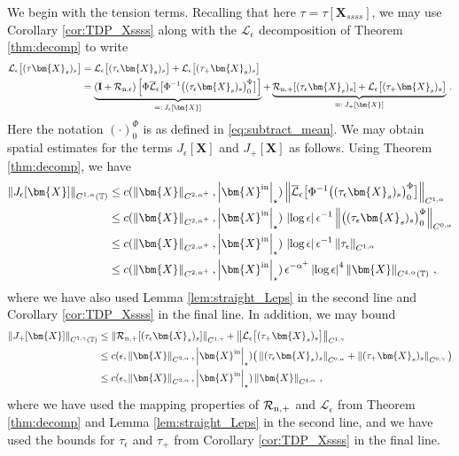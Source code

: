 \documentclass[11pt,reqno]{amsart}
\newcommand{\T}{\mathbb{T}}
\newcommand{\X}{\bm{X}}
\newcommand{\abs}[1]{\left\lvert #1 \right\rvert}
\newcommand{\norm}[1]{\left\lVert #1 \right\rVert}
\newcommand{\mc}[1]{\mathcal{#1}}
\theoremstyle{definition}
\begin{document}
We begin with the tension terms. Recalling that here $\tau=\tau[\X_{ssss}]$, we may use Corollary \ref{cor:TDP_Xssss} along with the $\mc{L}_\epsilon$ decomposition of Theorem \ref{thm:decomp} to write 
\begin{equation}\label{eq:tension_terms}
\begin{aligned}
  \mc{L}_\epsilon\big[(\tau\X_s)_s\big] &= \mc{L}_\epsilon\big[(\tau_\epsilon\X_s)_s\big] + \mc{L}_\epsilon\big[(\tau_+\X_s)_s\big] \\
  &= \underbrace{({\bf I}+\mc{R}_{\rm n,\epsilon})\left[\Phi\overline{\mc{L}}_\epsilon\big[\Phi^{-1}\big((\tau_\epsilon\X_s)_s\big)^\Phi_0\big] \right]}_{=: \,J_\epsilon[\X]} 
  + \underbrace{\mc{R}_{\rm n,+}[(\tau_\epsilon\X_s)_s]+ \mc{L}_\epsilon\big[(\tau_+\X_s)_s\big]}_{=: \,J_+[\X]}\,.
\end{aligned}
\end{equation}
Here the notation $(\cdot)_0^\Phi$ is as defined in \eqref{eq:subtract_mean}. We may obtain spatial estimates for the terms $J_\epsilon[\X]$ and $J_+[\X]$ as follows. Using Theorem \ref{thm:decomp}, we have
\begin{equation}
\begin{aligned}
  \norm{J_\epsilon[\X]}_{C^{1,\alpha}(\T)} &\le c(\norm{\X}_{C^{2,\alpha^+}},\abs{\X^{\rm in}}_\star)\norm{\overline{\mc{L}}_\epsilon\big[\Phi^{-1}\big((\tau_\epsilon\X_s)_s\big)^\Phi_0\big]}_{C^{1,\alpha}} \\
  &\le c(\norm{\X}_{C^{2,\alpha^+}},\abs{\X^{\rm in}}_\star)\,\abs{\log\epsilon}\epsilon^{-1}\norm{\big((\tau_\epsilon\X_s)_s\big)^\Phi_0}_{C^{0,\alpha}}\\
  &\le c(\norm{\X}_{C^{2,\alpha^+}},\abs{\X^{\rm in}}_\star)\,\abs{\log\epsilon}\epsilon^{-1}\norm{\tau_\epsilon}_{C^{1,\alpha}}\\
  &\le c(\norm{\X}_{C^{2,\alpha^+}},\abs{\X^{\rm in}}_\star)\,\epsilon^{-\alpha^+}\abs{\log\epsilon}^4\norm{\X}_{C^{4,\alpha}(\T)}\,,
\end{aligned}
\end{equation}
where we have also used Lemma \ref{lem:straight_Leps} in the second line and Corollary \ref{cor:TDP_Xssss} in the final line. In addition, we may bound
\begin{equation}\label{eq:Jplus}
\begin{aligned}
  \norm{J_+[\X]}_{C^{1,\gamma}(\T)} &\le
  \norm{\mc{R}_{\rm n,+}[(\tau_\epsilon\X_s)_s]}_{C^{1,\gamma}}+ \norm{\mc{L}_\epsilon\big[(\tau_+\X_s)_s\big]}_{C^{1,\gamma}}\\
  &\le c(\epsilon,\norm{\X}_{C^{3,\alpha}},\abs{\X^{\rm in}}_\star)\big(\norm{(\tau_\epsilon\X_s)_s}_{C^{0,\alpha}}
  + \norm{(\tau_+\X_s)_s}_{C^{0,\gamma}}\big)\\
  &\le c(\epsilon,\norm{\X}_{C^{3,\alpha}},\abs{\X^{\rm in}}_\star)\norm{\X}_{C^{4,\alpha}}\,,
\end{aligned}
\end{equation}
where we have used the mapping properties of $\mc{R}_{\rm n,+}$ and $\mc{L}_\epsilon$ from Theorem \ref{thm:decomp} and Lemma \ref{lem:straight_Leps} in the second line, and we have used the bounds for $\tau_\epsilon$ and $\tau_+$ from Corollary \ref{cor:TDP_Xssss} in the final line. 
\end{document}
